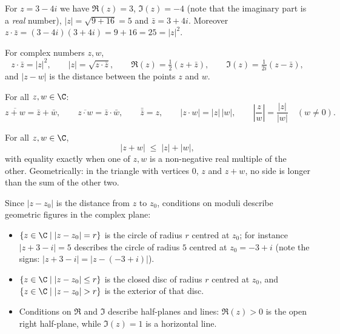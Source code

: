 \begin{example}
For $z = 3-4i$ we have $\Re(z) = 3$, $\Im(z) = -4$ (note that the imaginary part is a \emph{real} number),
$|z| = \sqrt{9+16} = 5$ and $\bar z = 3+4i$. Moreover
$z\cdot\bar z = (3-4i)(3+4i) = 9+16 = 25 = |z|^2$.
\end{example}

\begin{fact}[Properties]
For complex numbers $z,w$,
\[
z\cdot \bar{z} = |z|^2, \qquad |z| = \sqrt{z\cdot \bar{z}}, \qquad
\Re(z) = \tfrac12 (z+\bar{z}), \qquad \Im(z) = \tfrac{1}{2i} (z-\bar{z}),
\]
and $|z-w|$ is the distance between the points $z$ and $w$.
\end{fact}

\begin{fact}
For all $z,w\in\C$:
\[
\overline{z+w} = \bar z + \bar w, \qquad \overline{z\cdot w} = \bar z \cdot \bar w, \qquad \bar{\bar z} = z,
\qquad |z\cdot w| = |z|\,|w|, \qquad \left| \frac{z}{w} \right| = \frac{|z|}{|w|} \quad (w\neq 0).
\]
\end{fact}

\begin{fact}
For all $z,w\in\C$,
\[
|z+w| \;\leq\; |z| + |w|,
\]
with equality exactly when one of $z,w$ is a non-negative real multiple of the other. Geometrically: in the
triangle with vertices $0$, $z$ and $z+w$, no side is longer than the sum of the other two.
\end{fact}

\begin{example}
Since $|z-z_0|$ is the distance from $z$ to $z_0$, conditions on moduli describe geometric figures in the
complex plane:
\begin{itemize}
\item $\{z\in\C \mid |z-z_0| = r\}$ is the circle of radius $r$ centred at $z_0$; for instance
$|z+3-i| = 5$ describes the circle of radius $5$ centred at $z_0 = -3+i$ (note the signs:
$|z+3-i| = |z-(-3+i)|$).
\item $\{z\in\C \mid |z-z_0| \leq r\}$ is the closed disc of radius $r$ centred at $z_0$, and
$\{z\in\C \mid |z-z_0| > r\}$ is the exterior of that disc.
\item Conditions on $\Re$ and $\Im$ describe half-planes and lines: $\Re(z)>0$ is the open right
half-plane, while $\Im(z) = 1$ is a horizontal line.
\end{itemize}
\end{example}


